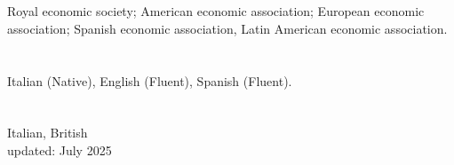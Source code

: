 \documentclass[margin, 11pt]{res} %
\begin{document}
\begin{resume}
 
\section{}
Royal economic society; American economic association; European economic association; Spanish economic association, Latin American economic association.

\section{}
Italian (Native), English (Fluent), Spanish (Fluent).

\section{}
Italian, British \\




%
%
%


\centering
updated: July 2025
\end{resume}
\end{document}
